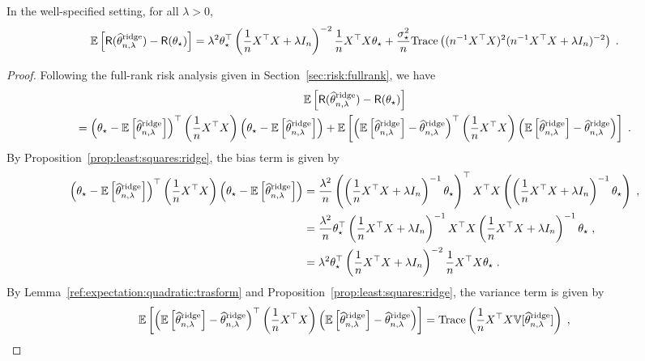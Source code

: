 \begin{proposition}
\label{prop:risk:ridge}
In the well-specified setting, for all $\lambda>0$,
$$
\mathbb{E}\left[\mathsf{R}(\widehat {\theta}^{\mathrm{ridge}}_{n,\lambda}) - \mathsf{R}(\theta_\star)\right] = \lambda^2\theta_\star^\top\left(\frac{1}{n}X^\top X + \lambda I_n\right)^{-2} \frac{1}{n}X^\top X \theta_\star +\frac{\sigma_\star^{2}}{n}\mathrm{Trace}\left((n^{-1}X^\top X)^2(n^{-1}X^\top X + \lambda I_n)^{-2}\right)\;.
$$
\end{proposition}
\begin{proof}
Following the full-rank risk analysis given in Section~\ref{sec:risk:fullrank}, we have
\begin{multline*}
\mathbb{E}\left[\mathsf{R}(\widehat {\theta}^{\mathrm{ridge}}_{n,\lambda}) - \mathsf{R}(\theta_\star)\right] \\
=\left(\theta_\star-\mathbb{E}\left[\widehat {\theta}^{\mathrm{ridge}}_{n,\lambda}\right]\right)^\top \left(\frac{1}{n}X^\top X\right) \left(\theta_\star-\mathbb{E}\left[\widehat {\theta}^{\mathrm{ridge}}_{n,\lambda}\right] \right) + \mathbb{E}\left[ \left(\mathbb{E}\left[\widehat {\theta}^{\mathrm{ridge}}_{n,\lambda}\right] - \widehat {\theta}^{\mathrm{ridge}}_{n,\lambda}\right)^\top \left(\frac{1}{n}X^\top X\right) \left(\mathbb{E}\left[\widehat {\theta}^{\mathrm{ridge}}_{n,\lambda}\right] - \widehat {\theta}^{\mathrm{ridge}}_{n,\lambda}\right)\right]\;.
\end{multline*}
By Proposition~\ref{prop:least:squares:ridge}, the bias term is given by
\begin{align*}
\left(\theta_\star-\mathbb{E}\left[\widehat {\theta}^{\mathrm{ridge}}_{n,\lambda}\right]\right)^\top \left(\frac{1}{n}X^\top X\right) \left(\theta_\star-\mathbb{E}\left[\widehat {\theta}^{\mathrm{ridge}}_{n,\lambda}\right] \right) &= \frac{\lambda^2}{n}\left(\left(\frac{1}{n}X^\top X + \lambda I_n\right)^{-1}\theta_\star\right)^\top X^\top X  \left(\left(\frac{1}{n}X^\top X + \lambda I_n\right)^{-1}\theta_\star\right)\;,\\
&= \frac{\lambda^2}{n}\theta_\star^\top\left(\frac{1}{n}X^\top X + \lambda I_n\right)^{-1} X^\top X \left(\frac{1}{n}X^\top X + \lambda I_n\right)^{-1}\theta_\star\;,\\
&= \lambda^2\theta_\star^\top\left(\frac{1}{n}X^\top X + \lambda I_n\right)^{-2} \frac{1}{n}X^\top X \theta_\star\;.
\end{align*}
By Lemma~\ref{ref:expectation:quadratic:trasform} and  Proposition~\ref{prop:least:squares:ridge}, the variance term is given by
\begin{align*}
\bE\left[ \left(\bE\left[\widehat \param^{\mathrm{ridge}}_{n,\lambda}\right] - \widehat \param^{\mathrm{ridge}}_{n,\lambda}\right)^\top \left(\frac{1}{n}X^\top X\right) \left(\bE\left[\widehat \param^{\mathrm{ridge}}_{n,\lambda}\right] - \widehat \param^{\mathrm{ridge}}_{n,\lambda}\right)\right] &= \mathrm{Trace}\left(\frac{1}{n}X^\top X \bV[\widehat \param^{\mathrm{ridge}}_{n,\lambda}]\right)\eqsp,\\

\end{align*}
\end{proof}
